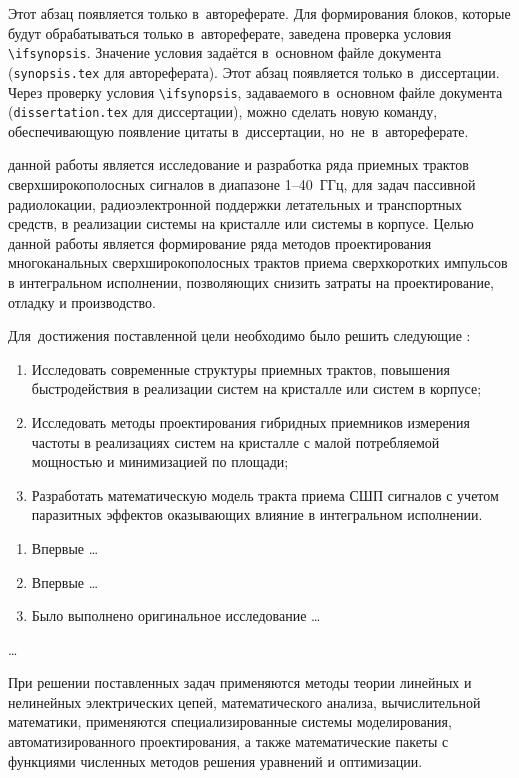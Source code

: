 \ifsynopsis
Этот абзац появляется только в~автореферате.
Для формирования блоков, которые будут обрабатываться только в~автореферате,
заведена проверка условия \verb!\!\verb!ifsynopsis!.
Значение условия задаётся в~основном файле документа (\verb!synopsis.tex! для
автореферата).
\else
Этот абзац появляется только в~диссертации.
Через проверку условия \verb!\!\verb!ifsynopsis!, задаваемого в~основном файле
документа (\verb!dissertation.tex! для диссертации), можно сделать новую
команду, обеспечивающую появление цитаты в~диссертации, но~не~в~автореферате.
\fi

{\aim} данной работы является исследование и разработка ряда приемных трактов сверхширокополосных сигналов в диапазоне \numrange[]{1}{40}~ГГц, для задач пассивной радиолокации, радиоэлектронной поддержки летательных и транспортных средств, в реализации системы на кристалле или системы в корпусе. Целью данной работы является формирование ряда методов проектирования многоканальных сверхширокополосных трактов приема сверхкоротких импульсов в интегральном исполнении, позволяющих снизить затраты на проектирование, отладку и производство.

Для~достижения поставленной цели необходимо было решить следующие {\tasks}:
\begin{enumerate}[beginpenalty=10000] %
  \item Исследовать современные структуры приемных трактов, повышения быстродействия в реализации систем на кристалле или систем в корпусе;
  \item Исследовать методы проектирования гибридных приемников измерения частоты в реализациях систем на кристалле с малой потребляемой мощностью и минимизацией по площади;
  \item Разработать математическую модель тракта приема СШП сигналов с учетом паразитных эффектов оказывающих влияние в интегральном исполнении.
\end{enumerate}

{\novelty}
\begin{enumerate}[beginpenalty=10000] %
  \item Впервые \ldots
  \item Впервые \ldots
  \item Было выполнено оригинальное исследование \ldots
\end{enumerate}

{\influence} \ldots

{\methods}
При решении поставленных задач применяются методы теории линейных и нелинейных электрических цепей, математического анализа, вычислительной математики, применяются специализированные системы моделирования, автоматизированного проектирования, а также математические пакеты с функциями численных методов решения уравнений и оптимизации.


